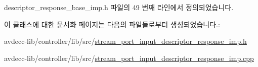 descriptor\+\_\+response\+\_\+base\+\_\+imp.\+h 파일의 49 번째 라인에서 정의되었습니다.



이 클래스에 대한 문서화 페이지는 다음의 파일들로부터 생성되었습니다.\+:\begin{DoxyCompactItemize}
\item 
avdecc-\/lib/controller/lib/src/\hyperlink{stream__port__input__descriptor__response__imp_8h}{stream\+\_\+port\+\_\+input\+\_\+descriptor\+\_\+response\+\_\+imp.\+h}\item 
avdecc-\/lib/controller/lib/src/\hyperlink{stream__port__input__descriptor__response__imp_8cpp}{stream\+\_\+port\+\_\+input\+\_\+descriptor\+\_\+response\+\_\+imp.\+cpp}\end{DoxyCompactItemize}
